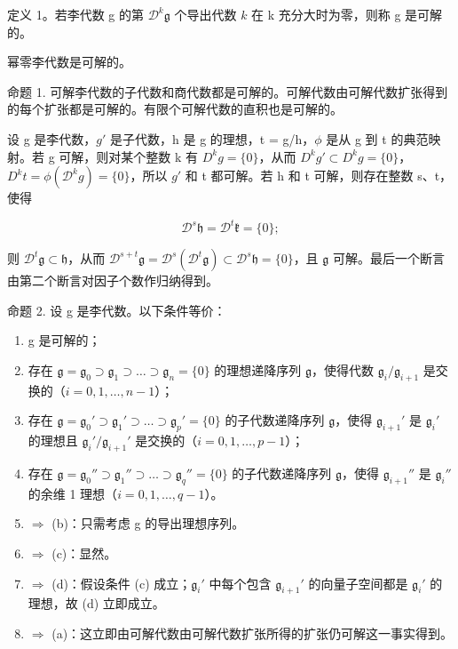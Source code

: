 定义 1。若李代数 g 的第 \(\mathcal{D}^{k}\mathfrak{g}\) 个导出代数 \(k\) 在 k 充分大时为零，则称 g 是可解的。

幂零李代数是可解的。

命题 1. 可解李代数的子代数和商代数都是可解的。可解代数由可解代数扩张得到的每个扩张都是可解的。有限个可解代数的直积也是可解的。

设 g 是李代数，\(g'\) 是子代数，h 是 g 的理想，t = g/h，\(\phi\) 是从 g 到 t 的典范映射。若 g 可解，则对某个整数 k 有 \(D^{k}g = \{0\}\)，从而 \(D^{k}g' \subset D^{k}g = \{0\}\)，\(D^{k}t = \phi(\mathcal{D}^{k}g) = \{0\}\)，所以 \(g'\) 和 t 都可解。若 h 和 t 可解，则存在整数 s、t，使得

\[
\mathcal {D} ^ {s} \mathfrak {h} = \mathcal {D} ^ {t} \mathfrak {k} = \{0 \};
\]

则 \(\mathcal{D}^t\mathfrak{g}\subset \mathfrak{h}\)，从而 \(\mathcal{D}^{s + t}\mathfrak{g} = \mathcal{D}^{s}(\mathcal{D}^{t}\mathfrak{g})\subset \mathcal{D}^{s}\mathfrak{h} = \{0\}\)，且 \(\mathfrak{g}\) 可解。最后一个断言由第二个断言对因子个数作归纳得到。

命题 2. 设 g 是李代数。以下条件等价：

\begin{enumerate}
\def\labelenumi{(\alph{enumi})}
\item
  g 是可解的；
\item
  存在 \(\mathfrak{g} = \mathfrak{g}_0 \supset \mathfrak{g}_1 \supset \dots \supset \mathfrak{g}_n = \{0\}\) 的理想递降序列 \(\mathfrak{g}\)，使得代数 \(\mathfrak{g}_i / \mathfrak{g}_{i+1}\) 是交换的（\(i = 0, 1, \ldots, n-1\)）；
\item
  存在 \(\mathfrak{g} = \mathfrak{g}_0' \supset \mathfrak{g}_1' \supset \dots \supset \mathfrak{g}_p' = \{0\}\) 的子代数递降序列 \(\mathfrak{g}\)，使得 \(\mathfrak{g}_{i+1}'\) 是 \(\mathfrak{g}_i'\) 的理想且 \(\mathfrak{g}_i'/\mathfrak{g}_{i+1}'\) 是交换的（\(i = 0, 1, \ldots, p - 1\)）；
\item
  存在 \(\mathfrak{g} = \mathfrak{g}_0'' \supset \mathfrak{g}_1'' \supset \dots \supset \mathfrak{g}_q'' = \{0\}\) 的子代数递降序列 \(\mathfrak{g}\)，使得 \(\mathfrak{g}_{i+1}''\) 是 \(\mathfrak{g}_i''\) 的余维 1 理想（\(i = 0, 1, \ldots, q - 1\)）。
\item
  \(\Rightarrow\) (b)：只需考虑 g 的导出理想序列。
\item
  \(\Rightarrow\) (c)：显然。
\item
  \(\Rightarrow\) (d)：假设条件 (c) 成立；\(\mathfrak{g}_i'\) 中每个包含 \(\mathfrak{g}_{i+1}'\) 的向量子空间都是 \(\mathfrak{g}_i'\) 的理想，故 (d) 立即成立。
\item
  \(\Rightarrow\) (a)：这立即由可解代数由可解代数扩张所得的扩张仍可解这一事实得到。
\end{enumerate}

